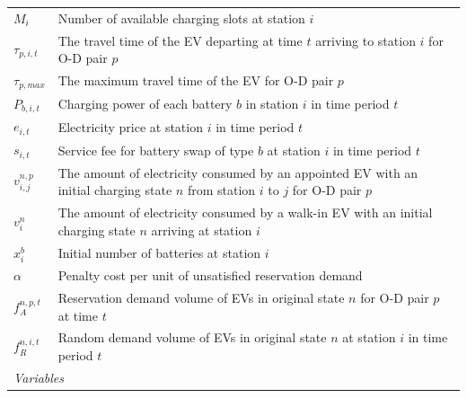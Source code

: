 \documentclass[12pt,hyperref,a4paper,UTF8]{ctexart}
\begin{document}
\begin{table}[!htbp]
\begin{tabular}{@{}lp{12cm}@{}}
    $M_i$ & Number of available charging slots at station $i$ \\
    $\tau_{p,i,t}$ & The travel time of the EV departing at time $t$ arriving to station $i$ for O-D pair $p$\\
    $\tau_{p,max}$ & The maximum travel time of the EV for O-D pair $p$\\
    $P_{b,i,t}$ & Charging power of each battery $b$ in station $i$ in time period $t$\\
    $e_{i,t}$ & Electricity price at station $i$ in time period $t$\\
    $s_{i,t}$ & Service fee for battery swap of type $b$ at station $i$ in time period $t$\\
    $v^{n,p}_{i,j}$ & The amount of electricity consumed by an appointed EV with an initial charging state $n$ from station $i$ to $j$ for O-D pair $p$\\
    $v^{n}_{i}$ & The amount of electricity consumed by a walk-in EV with an initial charging state $n$ arriving at station $i$\\
    $x_i^b$ & Initial number of batteries at station $i$ \\
    $\alpha$ & Penalty cost per unit of unsatisfied reservation demand\\
    $f_A^{n,p,t}$ & Reservation demand volume of EVs in original state $n$ for O-D pair $p$ at time $t$ \\
    $f_{R}^{n,i,t}$ & Random demand volume of EVs in original state $n$ at station $i$ in time period $t$ \\
    \midrule
    \multicolumn{2}{l}{\textit{Variables}} \\

\end{tabular}
\end{table}
\end{document}
